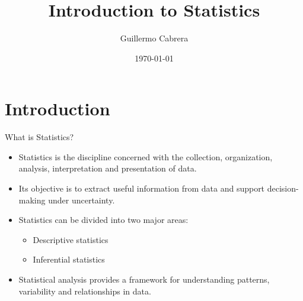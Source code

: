 \documentclass{beamer}
\title[Statistics]{Introduction to Statistics}
\author{Guillermo Cabrera}
\institute{Statistics and Data Analysis}
\date{\today}
\begin{document}

\begin{frame}
  \titlepage
\end{frame}






\section{Introduction}

\begin{frame}{What is Statistics?}

\begin{itemize}

  \item Statistics is the discipline concerned with the collection, organization, analysis, interpretation and presentation of data.

  \vskip 0.3cm

  \item Its objective is to extract useful information from data and support decision-making under uncertainty.

  \vskip 0.3cm

  \item Statistics can be divided into two major areas:

  \begin{itemize}
    \item Descriptive statistics
    \item Inferential statistics
  \end{itemize}

  \vskip 0.3cm

  \item Statistical analysis provides a framework for understanding patterns, variability and relationships in data.

\end{itemize}

\end{frame}
\end{document}
